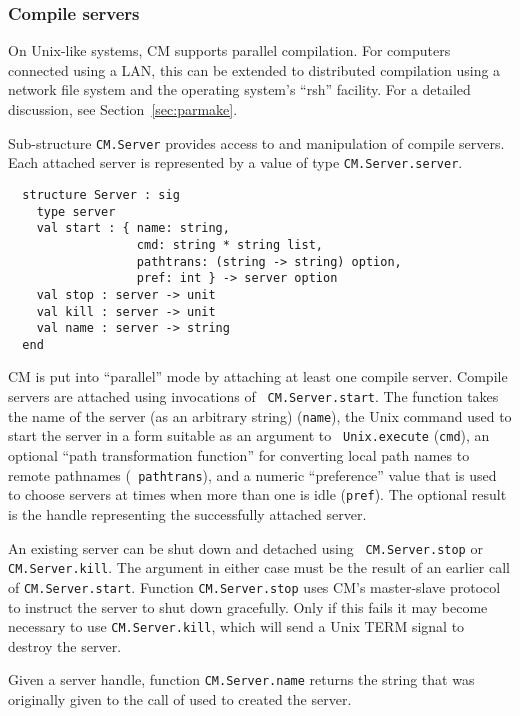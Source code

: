 \documentclass[titlepage,letterpaper]{article}
\begin{document}
\subsubsection{Compile servers}

On Unix-like systems, CM supports parallel compilation.  For computers
connected using a LAN, this can be extended to distributed compilation
using a network file system and the operating system's ``rsh''
facility.  For a detailed discussion, see Section~\ref{sec:parmake}.

Sub-structure {\tt CM.Server} provides access to and manipulation of
compile servers.  Each attached server is represented by a value of
type {\tt CM.Server.server}.

\begin{verbatim}
  structure Server : sig
    type server
    val start : { name: string,
                  cmd: string * string list,
                  pathtrans: (string -> string) option,
                  pref: int } -> server option
    val stop : server -> unit
    val kill : server -> unit
    val name : server -> string
  end
\end{verbatim}

CM is put into ``parallel'' mode by attaching at least one compile
server.  Compile servers are attached using invocations of {\tt
CM.Server.start}.  The function takes the name of the server (as an
arbitrary string) ({\tt name}), the Unix command used to
start the server in a form suitable as an argument to {\tt
Unix.execute} ({\tt cmd}), an optional ``path transformation
function'' for converting local path names to remote pathnames ({\tt
pathtrans}), and a numeric ``preference'' value that is used to choose
servers at times when more than one is idle ({\tt pref}).  The
optional result is the handle representing the successfully attached
server.

An existing server can be shut down and detached using {\tt
CM.Server.stop} or {\tt CM.Server.kill}.  The argument in either case
must be the result of an earlier call of {\tt CM.Server.start}.
Function {\tt CM.Server.stop} uses CM's master-slave protocol to
instruct the server to shut down gracefully.  Only if this fails it
may become necessary to use {\tt CM.Server.kill}, which will send a
Unix TERM signal to destroy the server.

Given a server handle, function {\tt CM.Server.name} returns the
string that was originally given to the call of used to created the server.
\end{document}
